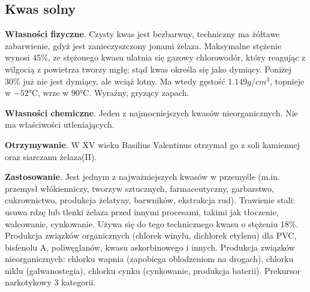 \subsection{Kwas solny }
\textbf{Własności fizyczne}.
Czysty kwas jest bezbarwny, techniczny ma żółtawe zabarwienie, gdyż jest zanieczyszczony jonami żelaza.
Maksymalne stężenie wynosi 45\%, ze stężonego kwasu ulatnia się gazowy chlorowodór, który reagując z wilgocią z powietrza tworzy mgłę; stąd kwas określa się jako dymiący.
Poniżej 30\% już nie jest dymiący, ale wciąż lotny.
Ma wtedy gęstość $1.149 \si{g \per cm^3}$, topnieje w $-52\si{\celsius}$, wrze w $90\si{\celsius}$.
Wyraźny, gryzący zapach.

\textbf{Własności chemiczne}.
Jeden z najmocniejszych kwasów nieorganicznych.
Nie ma właściwości utleniających.

\textbf{Otrzymywanie}.
W XV wieku Basilius Valentinus otrzymał go z soli kamiennej oraz siarczanu żelaza(II).



\textbf{Zastosowanie}.
Jest jednym z najważniejszych kwasów w przemyśle (m.in. przemysł włókienniczy, tworzyw sztucznych, farmaceutyczny, garbarstwo, cukrownictwo, produkcja żelatyny, barwników, ekstrakcja rud).
Trawienie stali: usuwa rdzę lub tlenki żelaza przed innymi procesami, takimi jak tłoczenie, walcowanie, cynkowanie. Używa się do tego technicznego kwasu o stężeniu 18\%.
Produkcja związków organicznych (chlorek winylu, dichlorek etylenu) dla PVC, bisfenolu A, poliwęglanów, kwasu askorbinowego i innych.
Produkcja związków nieorganicznych: chlorku wapnia (zapobiega oblodzeniom na drogach), chlorku niklu (galwanostegia), chlorku cynku (cynkowanie, produkcja baterii).
Prekursor narkotykowy 3 kategorii.
